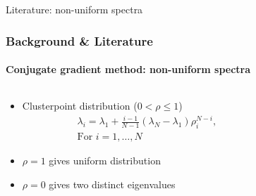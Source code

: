 \footerinfootnotestrue
\begin{frame}[label=background,fragile]{Literature: non-uniform spectra}
    \frametitle{Background \& Literature}
    \framesubtitle{Conjugate gradient method: non-uniform spectra}
    \begin{columns}[T,onlytextwidth]
        \begin{column}{.5\textwidth}
            \begin{itemize}
                \item<1-> Clusterpoint distribution ($0 < \rho \leq 1$)\cite{cg_convrate_Strakos1991}
                \begin{align*}
                    &\lambda_i = \lambda_1 + \frac{i-1}{N-1}(\lambda_N - \lambda_1)\rho_i^{N-i}, \\ 
                    &\text{For }i = 1, \dots, N
                \end{align*}
                \item<2-> $\rho = 1$ gives uniform distribution
                \item<3-> $\rho = 0$ gives two distinct eigenvalues
            \end{itemize}
        \end{column}
        \begin{column}{.45\textwidth}
        \end{column}
    \end{columns}
\end{frame}

